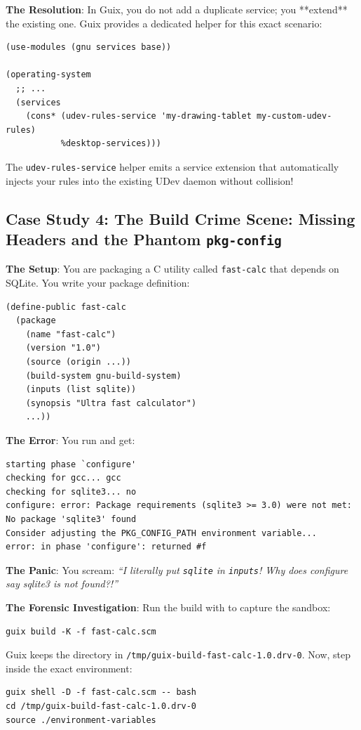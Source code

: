 \textbf{The Resolution}: In Guix, you do not add a duplicate service; you **extend** the existing one. Guix provides a dedicated helper for this exact scenario:

\begin{lstlisting}[style=guixscheme]
(use-modules (gnu services base))

(operating-system
  ;; ...
  (services
    (cons* (udev-rules-service 'my-drawing-tablet my-custom-udev-rules)
           %desktop-services)))
\end{lstlisting}
The \texttt{udev-rules-service} helper emits a service extension that automatically injects your rules into the existing UDev daemon without collision!

\subsection{Case Study 4: The Build Crime Scene: Missing Headers and the Phantom \texttt{pkg-config}}

\textbf{The Setup}: You are packaging a C utility called \texttt{fast-calc} that depends on SQLite. You write your package definition:

\begin{lstlisting}[style=guixscheme]
(define-public fast-calc
  (package
    (name "fast-calc")
    (version "1.0")
    (source (origin ...))
    (build-system gnu-build-system)
    (inputs (list sqlite))
    (synopsis "Ultra fast calculator")
    ...))
\end{lstlisting}

\textbf{The Error}: You run  and get:
\begin{lstlisting}[style=guixcli]
starting phase `configure'
checking for gcc... gcc
checking for sqlite3... no
configure: error: Package requirements (sqlite3 >= 3.0) were not met:
No package 'sqlite3' found
Consider adjusting the PKG_CONFIG_PATH environment variable...
error: in phase 'configure': returned #f
\end{lstlisting}

\textbf{The Panic}: You scream: \emph{``I literally put \texttt{sqlite} in \texttt{inputs}! Why does configure say sqlite3 is not found?!''}

\textbf{The Forensic Investigation}:
Run the build with  to capture the sandbox:
\begin{lstlisting}[style=guixcli]
guix build -K -f fast-calc.scm
\end{lstlisting}
Guix keeps the directory in \texttt{/tmp/guix-build-fast-calc-1.0.drv-0}.
Now, step inside the exact environment:
\begin{lstlisting}[style=guixcli]
guix shell -D -f fast-calc.scm -- bash
cd /tmp/guix-build-fast-calc-1.0.drv-0
source ./environment-variables
\end{lstlisting}

